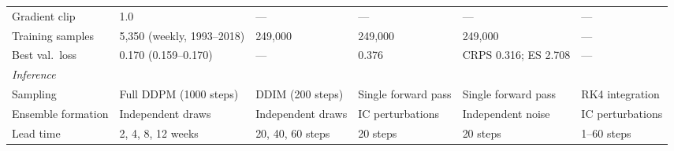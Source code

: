 \begin{table}[h]
\begin{adjustbox}{max width=\textwidth}
\begin{tabular}{llllll}
\quad Gradient clip           & 1.0                & ---                   & ---                   & ---                   & ---            \\
\quad Training samples        & 5{,}350 (weekly, 1993--2018) & 249,000               & 249,000               & 249,000               & ---            \\
\quad Best val.\ loss         & 0.170 (0.159--0.170) & ---        & 0.376                 & CRPS 0.316; ES 2.708  & ---            \\
\midrule
\multicolumn{6}{l}{\textit{Inference}} \\
\quad Sampling                & Full DDPM (1000 steps) & DDIM (200 steps) & Single forward pass & Single forward pass & RK4 integration \\
\quad Ensemble formation      & Independent draws  & Independent draws     & IC perturbations      & Independent noise     & IC perturbations \\
\quad Lead time               & 2, 4, 8, 12 weeks  & 20, 40, 60 steps      & 20 steps              & 20 steps              & 1--60 steps    \\
\bottomrule
\end{tabular}
\end{adjustbox}
\end{table}
